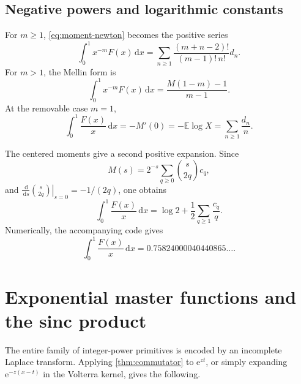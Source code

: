 \documentclass[11pt,oneside]{article}
\theoremstyle{definition}
\theoremstyle{remark}
\newcommand{\E}{\mathbb E}
\newcommand{\dd}{\,\mathrm d}
\newcommand{\e}{\mathrm e}
\newcommand{\1}{\mathbf 1}
\begin{document}
\subsection{Negative powers and logarithmic constants}
For \(m\geq1\), \eqref{eq:moment-newton} becomes the positive series
\begin{equation}
 \int_0^1x^{-m}F(x)\dd x
 =\sum_{n\geq1}\frac{(m+n-2)!}{(m-1)!\,n!}d_n.                 \label{eq:negative-moment-series}
\end{equation}
For \(m>1\), the Mellin form is
\begin{equation}
 \int_0^1x^{-m}F(x)\dd x=\frac{M(1-m)-1}{m-1}.                \label{eq:negative-M}
\end{equation}
At the removable case \(m=1\),
\begin{equation}
 \boxed{\quad
 \int_0^1\frac{F(x)}x\dd x
 =-M'(0)=-\E\log X
 =\sum_{n\geq1}\frac{d_n}{n}.
 \quad}                                                        \label{eq:log-constant-d}
\end{equation}

The centered moments give a second positive expansion.  Since
\begin{equation}
 M(s)=2^{-s}\sum_{q\geq0}\binom{s}{2q}c_q,                     \label{eq:M-centered}
\end{equation}
and \(\left.\frac{\dd}{\dd s}\binom{s}{2q}\right|_{s=0}
=-1/(2q)\), one obtains
\begin{equation}
 \boxed{\quad
 \int_0^1\frac{F(x)}x\dd x
 =\log2+\frac12\sum_{q\geq1}\frac{c_q}{q}.
 \quad}                                                        \label{eq:log-constant-c}
\end{equation}
Numerically, the accompanying code gives
\begin{equation}
 \int_0^1\frac{F(x)}x\dd x
 =0.75824000040440865\ldots.                                  \label{eq:log-constant-num}
\end{equation}

\section{Exponential master functions and the sinc product}

The entire family of integer-power primitives is encoded by an incomplete
Laplace transform.  Applying \cref{thm:commutator} to \(\e^{zt}\), or simply
expanding \(\e^{-z(x-t)}\) in the Volterra kernel, gives the following.
\end{document}
